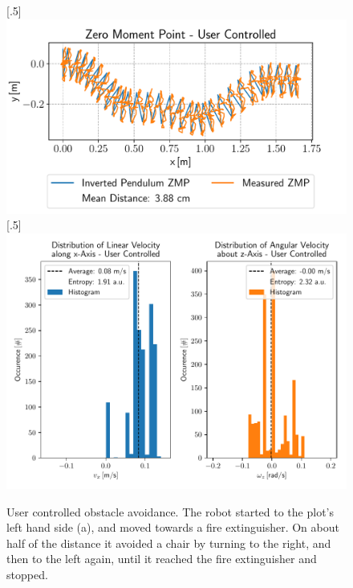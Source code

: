 \begin{figure}[h!]
	[.5\linewidth]{\includegraphics[scale=.45]{chapters/05_experiments/01_user_controlled_walking/02_test_environment/obstacle_walk_02_zmp.pdf}}
	[.5\linewidth]{\includegraphics[scale=.45]{chapters/05_experiments/01_user_controlled_walking/02_test_environment/obstacle_walk_02_entropy.pdf}}
	\caption{User controlled obstacle avoidance. The robot started to the plot's left hand side (a), and moved towards a fire extinguisher. On about half of the distance it avoided a chair by turning to the right, and then to the left again, until it reached the fire extinguisher and stopped.}
	\label{fig::512_uc_obstacle}
\end{figure} 
